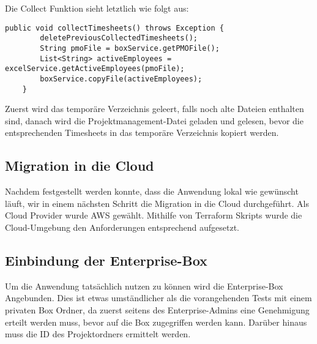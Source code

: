 Die Collect Funktion sieht letztlich wie folgt aus:

\begin{lstlisting}[caption=collectTimesheets Funktion]
    public void collectTimesheets() throws Exception {
        deletePreviousCollectedTimesheets();
        String pmoFile = boxService.getPMOFile();
        List<String> activeEmployees = excelService.getActiveEmployees(pmoFile);
        boxService.copyFile(activeEmployees);
    }
\end{lstlisting}

Zuerst wird das temporäre Verzeichnis geleert, falls noch alte Dateien enthalten sind, danach wird die Projektmanagement-Datei geladen und gelesen, bevor die entsprechenden Timesheets in das temporäre Verzeichnis kopiert werden.

\subsection{Migration in die Cloud}
Nachdem festgestellt werden konnte, dass die Anwendung lokal wie gewünscht läuft, wir in einem nächsten Schritt die Migration in die Cloud durchgeführt. Als Cloud Provider wurde \ac{AWS} gewählt. Mithilfe von \gls{Terraform} Skripts wurde die Cloud-Umgebung den Anforderungen entsprechend aufgesetzt.

\subsection{Einbindung der Enterprise-Box}
Um die Anwendung tatsächlich nutzen zu können wird die Enterprise-Box Angebunden. Dies ist etwas umständlicher als die vorangehenden Tests mit einem privaten Box Ordner, da zuerst seitens des Enterprise-Admins eine Genehmigung erteilt werden muss, bevor auf die Box zugegriffen werden kann. Darüber hinaus muss die ID des Projektordners ermittelt werden.
\pagebreak